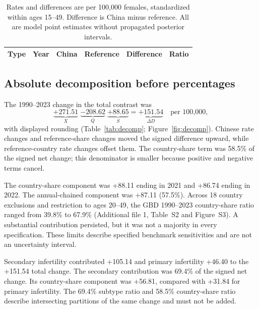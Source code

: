\documentclass[11pt,a4paper]{article}
\begin{document}
\begin{table}[htbp]\centering\small{}
\caption{PCOS-attributed infertility rates and contrasts under contemporary GBD population shares.}\label{tab:pcos}
\begin{tabular}{llrrrr}\toprule
Type & Year & China & Reference & Difference & Ratio\\\midrule
\end{tabular}
\caption*{Rates and differences are per 100,000 females, standardized within ages 15--49. Difference is China minus reference. All are model point estimates without propagated posterior intervals.}
\end{table}

\subsection{Absolute decomposition before percentages}
The 1990--2023 change in the total contrast was
\begin{equation}
 \underbrace{+271.51}_{X}\;\underbrace{-208.62}_{Q}\;\underbrace{+88.65}_{S}
 =\underbrace{+151.54}_{\Delta D}\quad\text{per 100,000},
\end{equation}
with displayed rounding (Table~\ref{tab:decomp}; Figure~\ref{fig:decomp}). Chinese rate changes and reference-share changes moved the signed difference upward, while reference-country rate changes offset them. The country-share term was 58.5\% of the signed net change; this denominator is smaller because positive and negative terms cancel.

The country-share component was +88.11 ending in 2021 and +86.74 ending in 2022. The annual-chained component was +87.11 (57.5\%). Across 18 country exclusions and restriction to ages 20--49, the GBD 1990--2023 country-share ratio ranged from 39.8\% to 67.9\% (Additional file 1, Table~S2 and Figure~S3). A substantial contribution persisted, but it was not a majority in every specification. These limits describe specified benchmark sensitivities and are not an uncertainty interval.

Secondary infertility contributed +105.14 and primary infertility +46.40 to the +151.54 total change. The secondary contribution was 69.4\% of the signed net change. Its country-share component was +56.81, compared with +31.84 for primary infertility. The 69.4\% subtype ratio and 58.5\% country-share ratio describe intersecting partitions of the same change and must not be added.
\end{document}
